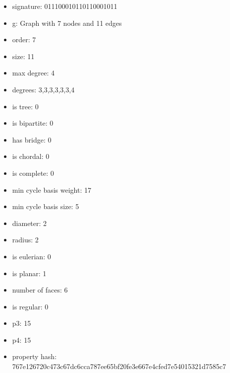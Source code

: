 \begin{itemize}
\item signature: 011100010110110001011
\item g: Graph with 7 nodes and 11 edges
\item order: 7
\item size: 11
\item max degree: 4
\item degrees: 3,3,3,3,3,3,4
\item is tree: 0
\item is bipartite: 0
\item has bridge: 0
\item is chordal: 0
\item is complete: 0
\item min cycle basis weight: 17
\item min cycle basis size: 5
\item diameter: 2
\item radius: 2
\item is eulerian: 0
\item is planar: 1
\item number of faces: 6
\item is regular: 0
\item p3: 15
\item p4: 15
\item property hash: 767e126720c473c67dc6cca787ee65bf20fe3e667e4cfed7e54015321d7585c7
\end{itemize}
\newpage
\begin{figure}
\end{figure}
